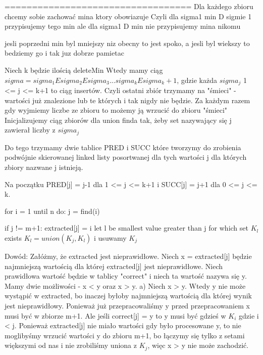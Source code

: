 \documentclass[12pt]{article}
\begin{document}
==================================
Dla każdego zbioru chcemy sobie zachować mina ktory obowiazuje
Czyli dla sigma1 min D 
sigmie 1 przypisujemy tego min 
ale dla sigma1 D min 
nie przypisujemy mina nikomu 

jesli poprzedni min byl mniejszy niz obecny to jest spoko, a jesli byl wiekszy to bedziemy go i tak juz dobrze pamietac


Niech k będzie ilością deleteMin    
Wtedy mamy ciąg $sigma = sigma_1 E sigma_2 E sigma_3 ... sigma_k E sigma_k+1$, gdzie każda $sigma_j$ 1 <= j <= k+1 to ciąg insertów. 
Czyli ostatni zbiór trzymamy na "śmieci" - wartości już znalezione lub te których i tak nigdy nie będzie.
Za każdym razem gdy wyjmiemy liczbe ze zbioru to możemy ją wrzucić do zbioru "śmieci"
Inicjalizujemy ciąg zbiorów dla union finda tak, żeby set nazywający się j zawierał liczby z $sigma_j$

Do tego trzymamy dwie tablice PRED i SUCC które tworzymy do zrobienia podwójnie skierowanej linked listy posortwanej dla tych wartości j dla których zbiory nazwane j istnieją. 

Na początku PRED[j] = j-1 dla 1 <= j <= k+1 i SUCC[j] = j+1 dla 0 <= j <= k.


for i = 1 until n do:
    j = find(i)

    if j != m+1:
        extracted[j] = i 
        let l be smallest value greater than j for which set $K_l$ exists 
        $K_l = union(K_j, K_l)$ i usuwamy $K_j$

Dowód:
Załóżmy, że extracted jest nieprawidłowe. Niech x = extracted[j] będzie najmniejszą wartością dla której extracted[j] jest nieprawidłowe. Niech prawidłowa wartość będzie w tablicy "correct" i niech ta wartość nazywa się y. Mamy dwie możliwości - x < y oraz x > y. 
a) Niech x > y. Wtedy y nie może wystąpić w extracted, bo inaczej byłoby najmniejszą wartością dla której wynik jest nieprawidłowy. Ponieważ już przepracowaliśmy y przed przepracowaniem x musi być w zbiorze m+1. Ale jeśli correct[j] = y to y musi być gdzieś w $K_i$ gdzie i < j. Ponieważ extracted[j] nie miało wartości gdy było procesowane y, to nie moglibyśmy wrzucić wartości y do zbioru m+1, bo łączymy się tylko z setami większymi od nas i nie zrobiliśmy uniona z $K_j$, więc x > y nie może zachodzić. 
\end{document}
